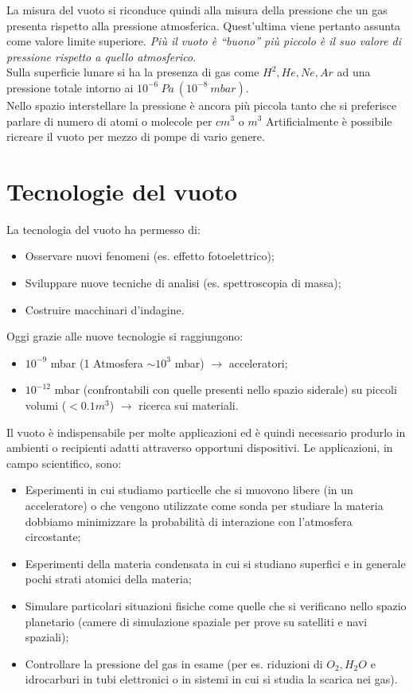\documentclass[12pt, letterpaper]{book}
\begin{document}
La misura del vuoto si riconduce quindi alla misura della pressione che un gas presenta rispetto alla pressione atmosferica. Quest'ultima viene pertanto assunta come valore limite superiore. \textit{Più il vuoto è “buono” più piccolo è il suo valore di pressione rispetto a quello atmosferico}.\\
Sulla superficie lunare si ha la presenza di gas come $H^2, He, Ne, Ar$ ad una pressione totale intorno ai $10^{-6}~Pa ~(10^{-8}~ mbar)$.\\
Nello spazio interstellare la pressione è ancora più piccola tanto che si preferisce parlare di numero di atomi o molecole per $cm^3$ o $m^3$
Artificialmente è possibile ricreare il vuoto per mezzo di pompe di vario genere.

\section{Tecnologie del vuoto}
La tecnologia del vuoto ha permesso di:
\begin{itemize}
    \item Osservare nuovi fenomeni (es. effetto fotoelettrico);
    \item Sviluppare nuove tecniche di analisi (es. spettroscopia di massa);
    \item  Costruire macchinari d'indagine.
\end{itemize}
Oggi grazie alle nuove tecnologie si raggiungono:
\begin{itemize}
    \item $10^{-9}$ mbar (1 Atmosfera $\sim 10^3$ mbar) $\rightarrow$ acceleratori;
    \item $10^{-12}$ mbar (confrontabili con quelle presenti nello spazio siderale) su piccoli volumi ($< 0.1 m^3$) $\rightarrow$ ricerca sui materiali.
\end{itemize}
Il vuoto è indispensabile per molte applicazioni ed è quindi necessario produrlo in ambienti o recipienti adatti attraverso opportuni dispositivi.
Le applicazioni, in campo scientifico, sono:
\begin{itemize}
    \item Esperimenti in cui studiamo particelle che si muovono libere (in un acceleratore) o che vengono utilizzate come sonda per studiare la materia dobbiamo minimizzare la probabilità di interazione con l’atmosfera circostante;
    \item Esperimenti della materia condensata in cui si studiano superfici e in generale pochi strati atomici della materia;
    \item Simulare particolari situazioni fisiche come quelle che si verificano nello spazio planetario (camere di simulazione spaziale per prove su satelliti e navi spaziali);
    \item Controllare la pressione del gas in esame (per es. riduzioni di $O_2, H_2O$ e idrocarburi in tubi elettronici o in sistemi in cui si studia la scarica nei gas).
\end{itemize}
\end{document}
